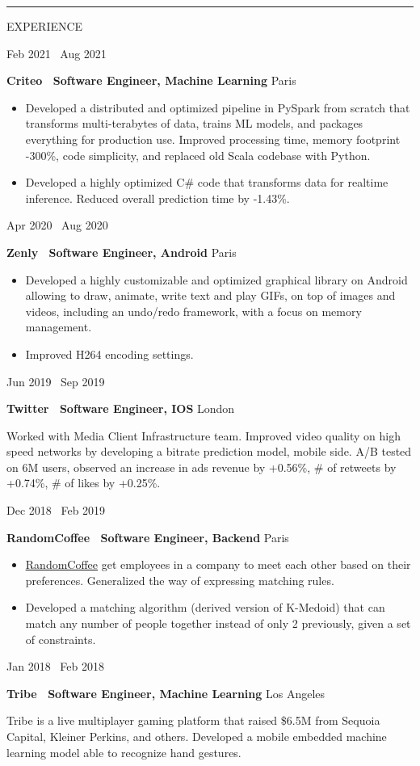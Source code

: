 \documentclass[11pt, a4paper]{article}
\newcommand{\firstcolwidth}{120pt}
\newcommand{\capitalletterspacing}{10}
\newcommand{\spaceaftersection}{1.3em}
\newcommand{\drawline}{\leavevmode\leaders\hrule height 1pt\hfill\kern 0pt}
\newcommand{\link}[2]{\underline{\textcolor{black}{\href{#1}{#2}}}}
\newcommand{\newsection}[1]{
    \drawline
    \break
    \begin{minipage}[t]{\firstcolwidth}
        \addfontfeature{LetterSpace=\capitalletterspacing}
        \footnotesize{\MakeUppercase{#1}}
        \addfontfeature{LetterSpace=0}
    \end{minipage}
}
\newcommand{\newsectionspace}{
    \begin{minipage}[t]{\linegoal}
        \hfill
        \vspace{\spaceaftersection}
    \end{minipage}
}
\newcommand{\internship}[6]{
    \begin{minipage}[t]{\firstcolwidth}
        \footnotesize{#1 \textemdash\ #2}
    \end{minipage}
    \begin{minipage}[t]{\linegoal}
        \textbf{\normalsize{#3 \textemdash\ #4}}
        \hfill
        \footnotesize{#5}
        \begin{singlespace}
            \begin{flushleft}
                \footnotesize{#6}
            \end{flushleft}
        \end{singlespace}
    \end{minipage}
}
\begin{document}
    \newsection{Experience}
    \newsectionspace
    \internship{Feb 2021}{Aug 2021}{Criteo}{Software Engineer, Machine Learning}{Paris}{
        \begin{itemize}[noitemsep]
            \item Developed a distributed and optimized pipeline in PySpark from scratch that transforms multi-terabytes of data, trains ML models, and packages everything for production use. Improved processing time, memory footprint -300\%, code simplicity, and replaced old Scala codebase with Python.
            \item Developed a highly optimized C\# code that transforms data for realtime inference. Reduced overall prediction time by -1.43\%.
        \end{itemize}
    }
    \newsectionspace
    \internship{Apr 2020}{Aug 2020}{Zenly}{Software Engineer, Android}{Paris}{
        \begin{itemize}[noitemsep]
            \item Developed a highly customizable and optimized graphical library on Android allowing to draw, animate, write text and play GIFs, on top of images and videos, including an undo/redo framework, with a focus on memory management.
            \item Improved H264 encoding settings.
        \end{itemize}
    }
    \newsectionspace
    \internship{Jun 2019}{Sep 2019}{Twitter}{Software Engineer, IOS}{London}{
        Worked with Media Client Infrastructure team. Improved video quality on high speed networks by developing a bitrate prediction model, mobile side. A/B tested on 6M users, observed an increase in ads revenue by +0.56\%, \# of retweets by +0.74\%, \# of likes by +0.25\%.
    }
    \newsectionspace
    \internship{Dec 2018}{Feb 2019}{RandomCoffee}{Software Engineer, Backend}{Paris}{
        \begin{itemize}[noitemsep]
            \item \link{https://www.random-coffee.com}{RandomCoffee} get employees in a company to meet each other based on their preferences. Generalized the way of expressing matching rules.
            \item Developed a matching algorithm (derived version of K-Medoid) that can match any number of people together instead of only 2 previously, given a set of constraints.
        \end{itemize}
    }
    \newsectionspace
    \internship{Jan 2018}{Feb 2018}{Tribe}{Software Engineer, Machine Learning}{Los Angeles}{
        Tribe is a live multiplayer gaming platform that raised \$6.5M from Sequoia Capital, Kleiner Perkins, and others. Developed a mobile embedded machine learning model able to recognize hand gestures.
    }
\end{document}
